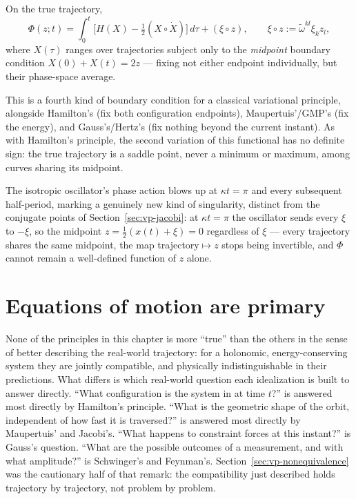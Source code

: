 On the true trajectory,
\[
\Phi(z;t) = \int_0^t\Big[H(X) - \tfrac12(X\circ\dot X)\Big]\,d\tau + (\xi\circ z), 
\qquad \xi\circ z:=\tilde\omega^{kl}\xi_kz_l,
\]
where $X(\tau)$ ranges over trajectories subject only to the \emph{midpoint}
boundary condition $X(0)+X(t)=2z$ --- fixing not either endpoint individually,
but their phase-space average.

This is a fourth kind of boundary condition for a classical variational
principle, alongside Hamilton's (fix both configuration endpoints),
Maupertuis'/GMP's (fix the energy), and Gauss's/Hertz's (fix nothing beyond the
current instant). As with Hamilton's principle, the second variation of this
functional has no definite sign: the true trajectory is a saddle point, never a
minimum or maximum, among curves sharing its midpoint.

The isotropic oscillator's phase action blows up at $\kappa t=\pi$ and every
subsequent half-period, marking a genuinely new kind of singularity, distinct
from the conjugate points of Section~\ref{sec:vp-jacobi}: at $\kappa t=\pi$ the
oscillator sends every $\xi$ to $-\xi$, so the midpoint
$z=\tfrac12(x(t)+\xi)=0$ regardless of $\xi$ --- every trajectory shares the
same midpoint, the map trajectory$\mapsto z$ stops being invertible, and $\Phi$
cannot remain a well-defined function of $z$ alone.


\section{Equations of motion are primary}
\label{sec:vp-primacy}

None of the principles in this chapter is more ``true'' than the others in the
sense of better describing the real-world trajectory: for a holonomic,
energy-conserving system they are jointly compatible, and physically
indistinguishable in their predictions. What differs is which real-world
question each idealization is built to answer directly. ``What configuration is
the system in at time $t$?'' is answered most directly by Hamilton's principle.
``What is the geometric shape of the orbit, independent of how fast it is
traversed?'' is answered most directly by Maupertuis' and Jacobi's. ``What
happens to constraint forces at this instant?'' is Gauss's question. ``What are
the possible outcomes of a measurement, and with what amplitude?'' is
Schwinger's and Feynman's. Section~\ref{sec:vp-nonequivalence} was the cautionary
half of that remark: the compatibility just described holds trajectory by
trajectory, not problem by problem.

